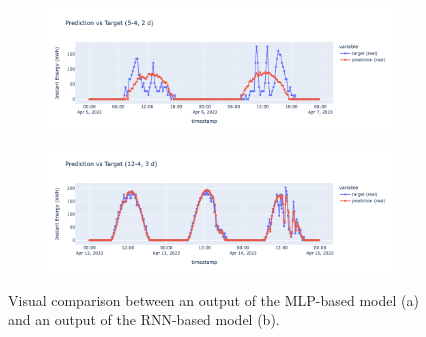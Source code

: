 


\begin{figure}[H]
	\centering
	\begin{subfigure}{\textwidth}
		\centering
		\includegraphics[width=.75\textwidth]{chapters/3_models/imgs/ufnc/eval/ufcpred5-4.png}
		\caption{}
	\end{subfigure}
	\begin{subfigure}{\textwidth}
		\centering
		\includegraphics[width=.75\textwidth]{chapters/3_models/imgs/grrun/eval/grruneval124.png}
		\caption{}
	\end{subfigure}
	\caption{Visual comparison between an output of the MLP-based model (a) and an output of the RNN-based model (b).}
\end{figure}
